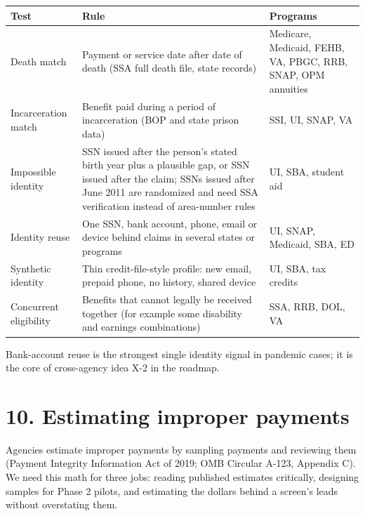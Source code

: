 \documentclass[letterpaper,11pt]{article}
\begin{document}
\begingroup\small\setlength{\tabcolsep}{4pt}\renewcommand{\arraystretch}{1.25}
\begin{longtable}[l]{@{}>{\raggedright\arraybackslash}p{}>{\raggedright\arraybackslash}p{}>{\raggedright\arraybackslash}p{}@{}}
\rowcolor{coolblack}\leavevmode\color{white}\bfseries Test & \leavevmode\color{white}\bfseries Rule & \leavevmode\color{white}\bfseries Programs \\
\endhead
Death match & Payment or service date after date of death (SSA full death file, state records) & Medicare, Medicaid, FEHB, VA, PBGC, RRB, SNAP, OPM annuities \\
Incarceration match & Benefit paid during a period of incarceration (BOP and state prison data) & SSI, UI, SNAP, VA \\
Impossible identity & SSN issued after the person's stated birth year plus a plausible gap, or SSN issued after the claim; SSNs issued after June 2011 are randomized and need SSA verification instead of area-number rules & UI, SBA, student aid \\
Identity reuse & One SSN, bank account, phone, email or device behind claims in several states or programs & UI, SNAP, Medicaid, SBA, ED \\
Synthetic identity & Thin credit-file-style profile: new email, prepaid phone, no history, shared device & UI, SBA, tax credits \\
Concurrent eligibility & Benefits that cannot legally be received together (for example some disability and earnings combinations) & SSA, RRB, DOL, VA \\
\end{longtable}\endgroup

Bank-account reuse is the strongest single identity signal in pandemic
cases; it is the core of cross-agency idea X-2 in the roadmap.

\hypertarget{estimating-improper-payments}{%
\section*{10. Estimating improper
payments}\label{estimating-improper-payments}}

Agencies estimate improper payments by sampling payments and reviewing
them (Payment Integrity Information Act of 2019; OMB Circular A-123,
Appendix C). We need this math for three jobs: reading published
estimates critically, designing samples for Phase 2 pilots, and
estimating the dollars behind a screen's leads without overstating them.
\end{document}
